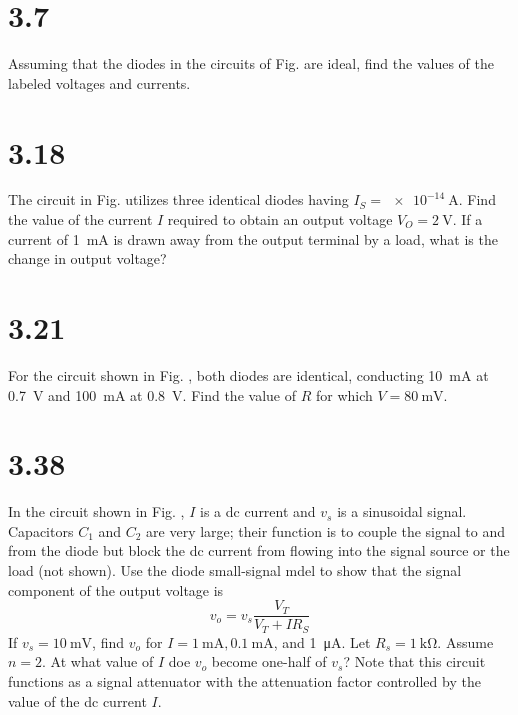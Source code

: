 \documentclass[12pt, a4paper]{article}
\title{} %
\author{} %
\date{} %
\newcommand{\siua}{\micro\ampere}
\newcommand{\sima}{\milli\ampere}
\newcommand{\simv}{\milli\volt}
\newcommand{\siko}{\kilo\ohm}
\newcommand{\sia}{\ampere}
\newcommand{\siv}{\volt}
\theoremstyle{mystyle}	%
\begin{document}
\section{3.7}
Assuming that the diodes in the circuits of Fig. are ideal,
find the values of the labeled voltages and currents.

\section{3.18}
The circuit in Fig. utilizes three identical diodes having
$I_S = \SI{e-14}{\sia}$. Find the value of the current $I$ required
to obtain an output voltage $V_O = \SI{2}{\siv}$. If a current of
\SI{1}{\sima} is drawn away from the output terminal by a load,
what is the change in output voltage?

\section{3.21}
For the circuit shown in Fig. , both diodes are identical, conducting
\SI{10}{\sima} at \SI{0.7}{\siv} and \SI{100}{\sima}
at \SI{0.8}{\siv}. Find the value of $R$ for which
$V = \SI{80}{\simv}$.

\section{3.38}
In the circuit shown in Fig. , $I$ is a dc current and $v_s$ is a
sinusoidal signal. Capacitors $C_1$ and $C_2$ are very large; their
function is to couple the signal to and from the diode but block the
dc current from flowing into the signal source or the load (not shown).
Use the diode small-signal mdel to show that the signal component of the
output voltage is
\[ v_o = v_s \frac{V_T}{V_T + IR_S} \]
If $v_s = \SI{10}{\simv}$, find $v_o$ for
$I = \SI{1}{\sima}, \SI{0.1}{\sima}$, and
\SI{1}{\siua}. Let $R_s = \SI{1}{\siko}$. Assume $n = 2$. At
what value of $I$ doe $v_o$ become one-half of $v_s$?
Note that this circuit functions as a signal attenuator with the
attenuation factor controlled by the value of the dc current $I$.

\end{document}
